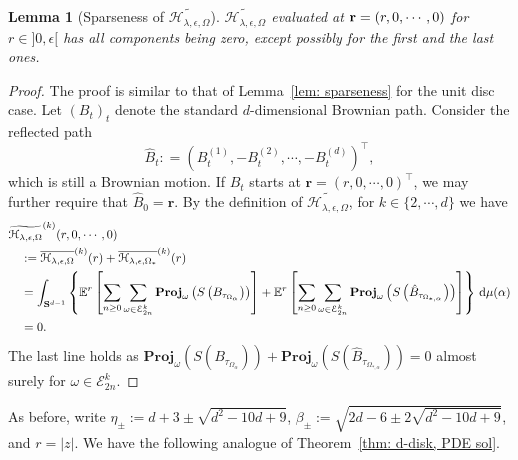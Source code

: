 \documentclass[11pt,a4paper,english,reqno]{amsart}
\theoremstyle{plain}
\newtheorem{lemma}[definition]{Lemma}
\newcommand{\dd}{{\rm d}}
\newcommand{\e}{\epsilon}
\newcommand{\1}{\mathbbm{1}}
\newcommand{\proj}{\mathbf{Proj}}
\begin{document}
\begin{lemma}[Sparseness of $\widetilde{\mathcal{H}_{\lambda,\e,\Omega}}$]\label{lem:domain_averaging_development_reflected_domain} $\widetilde{\mathcal{H}_{\lambda,\e,\Omega}}$ evaluated at ${\bf r} = (r, 0, \cdots, 0)$ for $r \in ]0, \epsilon[$ has all components being zero, except possibly for the first and the last ones. 
\end{lemma}


\begin{proof}
The proof is similar to that of Lemma~\ref{lem: sparseness} for the unit disc case. Let $(B_t)_{t}$ denote the standard $d$-dimensional Brownian path.  
Consider the reflected path
\begin{equation}\label{reflected BM}
\hat{B}_t: = \left(B^{(1)}_{t}, - B^{(2)}_t, \cdots, -B^{(d)}_t\right)^\top,
\end{equation}
which is still a Brownian motion. If $B_t$ starts at $\mathbf{r} = (r, 0, \cdots, 0)^\top$, we may further require that $\hat{B}_{0} = \mathbf{r}$.
By the definition of $\widetilde{\mathcal{H}_{\lambda,\e,\Omega}}$, for $k \in \{2, \cdots, d\}$ we have
\begin{align*}
&\widetilde{\mathcal{H}_{\lambda,\e,\Omega}}^{(k)}(r,0, \cdots, 0)\\
&\quad :=\overline{\mathcal{H}_{\lambda, \e, \Omega}}^{(k)}(r) + \overline{\mathcal{H}_{\lambda, \e, \Omega_\ast}}^{(k)}(r)\\
&\quad = \int_{{\bf S}^{d-1}}\left\{\mathbb{E}^{r}\left[ \sum_{n \geq 0} \sum_{\omega \in \mathcal{E}_{2n}^{k}} \proj_{\omega}\left(S\left(B_{\tau_{\Omega_{\alpha}}}\right)\right)\right] + \mathbb{E}^{r}\left[ \sum_{n \geq 0} \sum_{\omega \in \mathcal{E}_{2n}^{k}} \proj_{\omega}\left(S\left(\hat{B}_{\tau_{\Omega_{\ast,\alpha}}}\right)\right)\right]\right\} \,\dd\mu(\alpha) \\
&\quad = 0.
\end{align*}
The last line holds as $\proj_{\omega}\left(S\left(B_{\tau_{\Omega_{\alpha}}}\right)\right) + \proj_{\omega}\left(S\left(\hat{B}_{\tau_{\Omega_{\ast,\alpha}}}\right)\right) = 0$ almost surely for $\omega \in \mathcal{E}_{2n}^{k}$.  \end{proof}

As before, write $\eta_\pm:= d+3 \pm \sqrt{d^2-10d+9}$, $\beta_\pm:=\sqrt{2d-6 \pm 2 \sqrt{d^2-10d+9}}$, and $r = |z|$. We have the following analogue of Theorem~\ref{thm: d-disk, PDE sol}.
\end{document}
